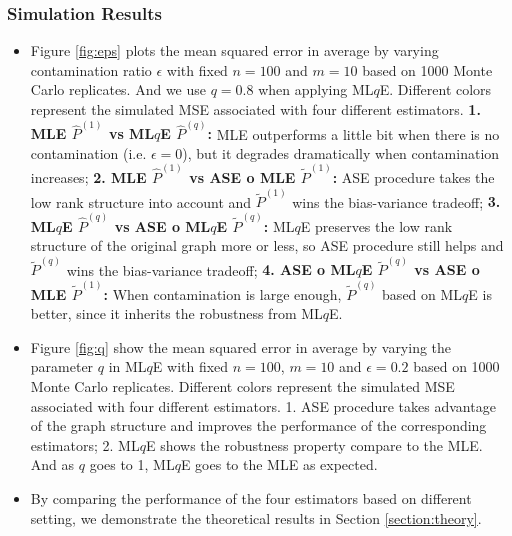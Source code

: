 \documentclass[a4paper]{article}
\renewcommand{\hat}{\widehat}
\begin{document}
\subsubsection{Simulation Results}
\begin{itemize}
\item Figure \ref{fig:eps} plots the mean squared error in average by varying contamination ratio $\epsilon$ with fixed $n = 100$ and $m = 10$ based on 1000 Monte Carlo replicates. And we use $q=0.8$ when applying ML$q$E.
Different colors represent the simulated MSE associated with four different estimators.
\textbf{1. MLE $\hat{P}^{(1)}$ vs ML$q$E $\hat{P}^{(q)}$:}
MLE outperforms a little bit when there is no contamination (i.e. $\epsilon = 0$), but it degrades dramatically when contamination increases;
\textbf{2. MLE $\hat{P}^{(1)}$ vs ASE o MLE $\widetilde{P}^{(1)}$: }
ASE procedure takes the low rank structure into account and $\widetilde{P}^{(1)}$ wins the bias-variance tradeoff;
\textbf{3. ML$q$E $\hat{P}^{(q)}$ vs ASE o ML$q$E $\widetilde{P}^{(q)}$: }
ML$q$E preserves the low rank structure of the original graph more or less, so ASE procedure still helps and $\widetilde{P}^{(q)}$ wins the bias-variance tradeoff;
\textbf{4. ASE o ML$q$E $\widetilde{P}^{(q)}$ vs ASE o MLE $\widetilde{P}^{(1)}$: }
When contamination is large enough, $\widetilde{P}^{(q)}$ based on ML$q$E is better, since it inherits the robustness from ML$q$E.
\item Figure \ref{fig:q} show the mean squared error in average by varying the parameter $q$ in ML$q$E with fixed $n = 100$, $m = 10$ and $\epsilon = 0.2$ based on 1000 Monte Carlo replicates. Different colors represent the simulated MSE associated with four different estimators.
1. ASE procedure takes advantage of the graph structure and improves the performance of the corresponding estimators;
2. ML$q$E shows the robustness property compare to the MLE. And as $q$ goes to 1, ML$q$E goes to the MLE as expected.
\item By comparing the performance of the four estimators based on different setting, we demonstrate the theoretical results in Section \ref{section:theory}.
\end{itemize}
\end{document}
